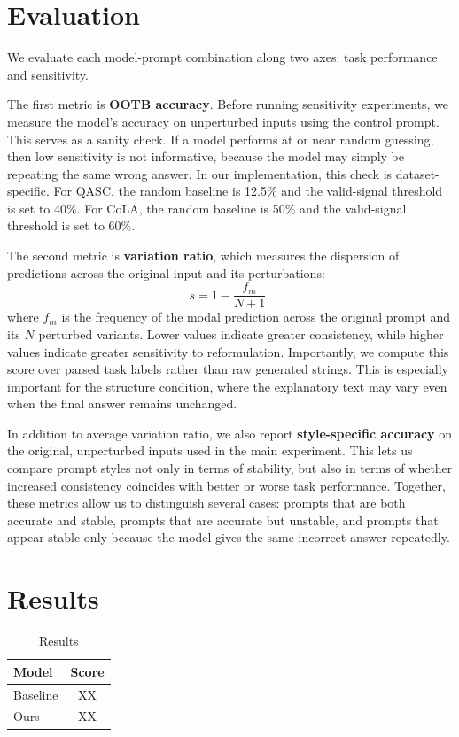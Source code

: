 \documentclass[11pt]{article}
\begin{document}
\section{Evaluation}

We evaluate each model-prompt combination along two axes: task performance and sensitivity.

The first metric is \textbf{OOTB accuracy}. Before running sensitivity experiments, we measure the model's accuracy on unperturbed inputs using the control prompt. This serves as a sanity check. If a model performs at or near random guessing, then low sensitivity is not informative, because the model may simply be repeating the same wrong answer. In our implementation, this check is dataset-specific. For QASC, the random baseline is 12.5\% and the valid-signal threshold is set to 40\%. For CoLA, the random baseline is 50\% and the valid-signal threshold is set to 60\%.

The second metric is \textbf{variation ratio}, which measures the dispersion of predictions across the original input and its perturbations:
\[
s = 1 - \frac{f_m}{N+1},
\]
where $f_m$ is the frequency of the modal prediction across the original prompt and its $N$ perturbed variants. Lower values indicate greater consistency, while higher values indicate greater sensitivity to reformulation. Importantly, we compute this score over parsed task labels rather than raw generated strings. This is especially important for the structure condition, where the explanatory text may vary even when the final answer remains unchanged.

In addition to average variation ratio, we also report \textbf{style-specific accuracy} on the original, unperturbed inputs used in the main experiment. This lets us compare prompt styles not only in terms of stability, but also in terms of whether increased consistency coincides with better or worse task performance. Together, these metrics allow us to distinguish several cases: prompts that are both accurate and stable, prompts that are accurate but unstable, and prompts that appear stable only because the model gives the same incorrect answer repeatedly.


\section{Results}

\begin{table}[h]
\centering
\begin{tabular}{l c}
\toprule
Model & Score \\
\midrule
Baseline & XX \\
Ours & XX \\
\bottomrule
\end{tabular}
\caption{Results}
\end{table}
\end{document}
